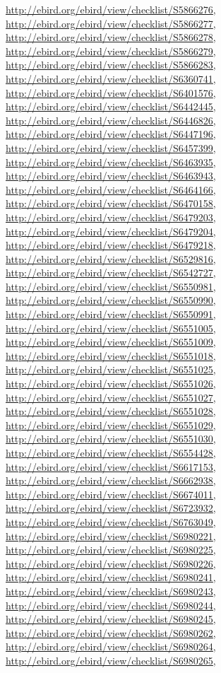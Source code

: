 \documentclass[9pt, article]{memoir}
\begin{document}
\begin{multicols}{2}
\url{http://ebird.org/ebird/view/checklist/S5866276}, 
\url{http://ebird.org/ebird/view/checklist/S5866277}, 
\url{http://ebird.org/ebird/view/checklist/S5866278}, 
\url{http://ebird.org/ebird/view/checklist/S5866279}, 
\url{http://ebird.org/ebird/view/checklist/S5866283}, 
\url{http://ebird.org/ebird/view/checklist/S6360741}, 
\url{http://ebird.org/ebird/view/checklist/S6401576}, 
\url{http://ebird.org/ebird/view/checklist/S6442445}, 
\url{http://ebird.org/ebird/view/checklist/S6446826}, 
\url{http://ebird.org/ebird/view/checklist/S6447196}, 
\url{http://ebird.org/ebird/view/checklist/S6457399}, 
\url{http://ebird.org/ebird/view/checklist/S6463935}, 
\url{http://ebird.org/ebird/view/checklist/S6463943}, 
\url{http://ebird.org/ebird/view/checklist/S6464166}, 
\url{http://ebird.org/ebird/view/checklist/S6470158}, 
\url{http://ebird.org/ebird/view/checklist/S6479203}, 
\url{http://ebird.org/ebird/view/checklist/S6479204}, 
\url{http://ebird.org/ebird/view/checklist/S6479218}, 
\url{http://ebird.org/ebird/view/checklist/S6529816}, 
\url{http://ebird.org/ebird/view/checklist/S6542727}, 
\url{http://ebird.org/ebird/view/checklist/S6550981}, 
\url{http://ebird.org/ebird/view/checklist/S6550990}, 
\url{http://ebird.org/ebird/view/checklist/S6550991}, 
\url{http://ebird.org/ebird/view/checklist/S6551005}, 
\url{http://ebird.org/ebird/view/checklist/S6551009}, 
\url{http://ebird.org/ebird/view/checklist/S6551018}, 
\url{http://ebird.org/ebird/view/checklist/S6551025}, 
\url{http://ebird.org/ebird/view/checklist/S6551026}, 
\url{http://ebird.org/ebird/view/checklist/S6551027}, 
\url{http://ebird.org/ebird/view/checklist/S6551028}, 
\url{http://ebird.org/ebird/view/checklist/S6551029}, 
\url{http://ebird.org/ebird/view/checklist/S6551030}, 
\url{http://ebird.org/ebird/view/checklist/S6554428}, 
\url{http://ebird.org/ebird/view/checklist/S6617153}, 
\url{http://ebird.org/ebird/view/checklist/S6662938}, 
\url{http://ebird.org/ebird/view/checklist/S6674011}, 
\url{http://ebird.org/ebird/view/checklist/S6723932}, 
\url{http://ebird.org/ebird/view/checklist/S6763049}, 
\url{http://ebird.org/ebird/view/checklist/S6980221}, 
\url{http://ebird.org/ebird/view/checklist/S6980225}, 
\url{http://ebird.org/ebird/view/checklist/S6980226}, 
\url{http://ebird.org/ebird/view/checklist/S6980241}, 
\url{http://ebird.org/ebird/view/checklist/S6980243}, 
\url{http://ebird.org/ebird/view/checklist/S6980244}, 
\url{http://ebird.org/ebird/view/checklist/S6980245}, 
\url{http://ebird.org/ebird/view/checklist/S6980262}, 
\url{http://ebird.org/ebird/view/checklist/S6980264}, 
\url{http://ebird.org/ebird/view/checklist/S6980265}, 

\end{multicols}
\end{document}
